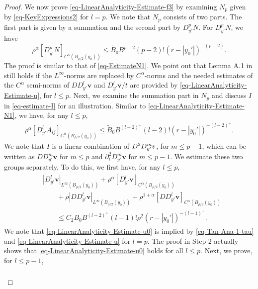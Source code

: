 \documentclass[11pt,reqno]{amsart}
\renewcommand{\leq}{\leqslant}
\theoremstyle{definition}
\numberwithin{equation}{section}
\begin{document}
\begin{proof}
We now  prove \eqref{eq-LinearAnalyticity-Estimate-f3}
by examining $N_p$ given by \eqref{eq-KeyExpressions2} for $l=p$. We note 
that $N_p$ consists of two parts. The first part is given by a summation 
and the second part 
by $D_{y'}^pN$. For $D_{y'}^pN$, we have 
\begin{equation}\label{eq-LinearAnalyticity-Estimate-N1}
\rho^{\alpha}[D_{y'}^pN]_{C^\alpha(B_{\rho/2}(y_0))}
\leq \widetilde B_0B^{p-2}(p-2)!(r-|y_0'|)^{-(p-2)}.\end{equation}
The proof is similar to that of \eqref{eq-EstimateN1}. We point out that 
Lemma A.1 in \cite{HanJiang1} still holds if the $L^\infty$-norms are 
replaced by $C^\alpha$-norms and the needed estimates of the 
$C^\alpha$ semi-norms of $DD_{y'}^l\mathbf v$ and 
$D_{y'}^l\mathbf v/t$ are provided by \eqref{eq-LinearAnalyticity-Estimate-u}, for $l\leq p$. 
Next, we examine the summation part in $N_p$ and discuss $I$ in 
\eqref{eq-estimate-I} for an illustration. Similar to 
\eqref{eq-LinearAnalyticity-Estimate-N1}, we have, for any $l\leq p$,  
\begin{align}\rho^{\alpha}[D_{y'}^lA_{ij}]_{C^\alpha(B_{\rho/2}(y_0))}
\leq \widetilde B_0B^{(l-2)^+}(l-2)!(r-|y_0'|)^{-(l-2)^+}.\end{align}
We note 
that $I$ is a linear combination of $D^2D_{y'}^{m}\mathbf \mathbf v$, for $m\leq p-1$, 
which can be written as $DD_{y'}^m \mathbf v$ for $m\leq p$ and 
$\partial_t^2D_{y'}^m \mathbf v$ for $m\leq p-1$. We estimate these two groups separately. 
To do this, we first have, for any $l\leq p$, 
\begin{align}\label{eq-LinearAnalyticity-Estimate-u0}\begin{split}
&|D_{y'}^l\mathbf v|_{L^\infty(B_{\rho/2}(y_0))}
+\rho^{\alpha}[D_{y'}^l \mathbf v]_{C^\alpha(B_{\rho/2}(y_0))}\\
&\qquad+\rho|DD_{y'}^l \mathbf v|_{L^\infty(B_{\rho/2}(y_0))}
+\rho^{1+\alpha}[DD_{y'}^l \mathbf v]_{C^\alpha(B_{\rho/2}(y_0))}\\
&\qquad \leq C_2 B_0B^{(l-2)^+}(l-1)!\rho^2(r-|y_0'|)^{-(l-1)^+}.
\end{split}\end{align}
We note that \eqref{eq-LinearAnalyticity-Estimate-u0} is implied by 
\eqref{eq-Tan-Ana-1-tau} and 
\eqref{eq-LinearAnalyticity-Estimate-u} for $l=p$. The proof in Step 2 actually shows 
that \eqref{eq-LinearAnalyticity-Estimate-u0} holds for all $l\leq p$. 
Next, we prove, for $l\leq p-1$, 
\begin{align}\label{eq-LinearAnalyticity-Estimate-u0a}\begin{split}

\end{split}
\end{align}
\end{proof}
\end{document}
